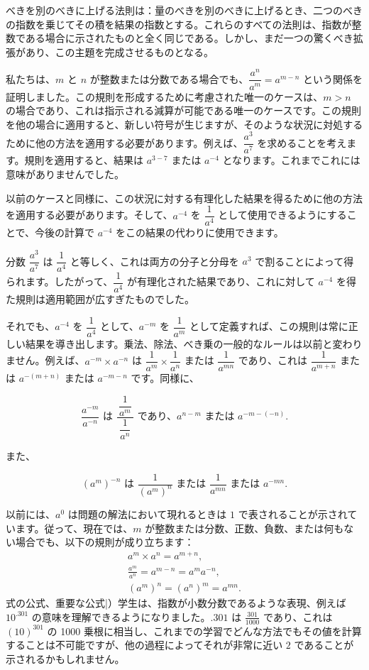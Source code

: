 \documentclass[a4paper,11pt,openany]{ltjsbook}
\newcommand{\Add}[1]{#1}
\begin{document}
べきを別のべきに上げる法則は：量のべきを別のべきに上げるとき、二つのべきの指数を乗じてその積を結果の指数とする。これらのすべての法則は、指数が整数である場合に示されたものと全く同じである。しかし、まだ一つの驚くべき拡張があり、この主題を完成させるものとなる。

私たちは、$m$ と $n$ が整数または分数である場合でも、$\dfrac{a^n}{a^m} = a^{m-n}$ という関係を証明しました。この規則を形成するために考慮された唯一のケースは、$m > n$ の場合であり、これは指示される減算が可能である唯一のケースです。この規則を他の場合に適用すると、新しい符号が生じますが、そのような状況に対処するために他の方法を適用する必要があります。例えば、$\dfrac{a^3}{a^7}$ を求めることを考えます。規則を適用すると、結果は $a^{3-7}$ または $a^{-4}$ となります。これまでこれには意味がありませんでした。

以前のケースと同様に、この状況に対する有理化した結果を得るために他の方法を適用する必要があります。そして、$a^{-4}$ を $\dfrac{1}{a^4}$ として使用できるようにすることで、今後の計算で $a^{-4}$ をこの結果の代わりに使用できます。

分数 $\dfrac{a^3}{a^7}$ は $\dfrac{1}{a^4}$ と等しく、これは両方の分子と分母を $a^3$ で割ることによって得られます。したがって、$\dfrac{1}{a^4}$ が有理化された結果であり、これに対して $a^{-4}$ を得た規則は適用範囲が広すぎたものでした。

それでも、$a^{-4}$ を $\dfrac{1}{a^4}$ として、$a^{-m}$ を $\dfrac{1}{a^m}$ として定義すれば、この規則は常に正しい結果を導き出します。乗法、除法、べき乗の一般的なルールは以前と変わりません。例えば、$a^{-m} × a^{-n}$ は $\dfrac{1}{a^m} × \dfrac{1}{a^n}$ または $\dfrac{1}{a^{mn}}$ であり、これは $\dfrac{1}{a^{m+n}}$ または $a^{-(m+n)}$ または $a^{-m-n}$ です。同様に、

\[
\dfrac{a^{-m}}{a^{-n}} \text{ は } \dfrac{\,\dfrac{1}{a^m}\,}{\dfrac{1}{a^n}} \text{ であり、} a^{n-m} \text{ または } a^{-m-(-n)}.
\]

また、

\[
(a^m)^{-n} \text{ は } \dfrac{1}{(a^m)^n} \text{ または } \dfrac{1}{a^{mn}} \text{ または } a^{-mn}.
\]

以前には、$a^{0}$ は問題の解法において現れるときは $1$ で表されることが示されています。従って、現在では、$m$ が整数または分数、正数、負数、または何もない場合でも、以下の規則が成り立ちます：
\begin{gather*}
a^{m} \times  a^{n} = a^{m+n}\Add{,} \\
\frac{a^{m}}{a^{n}} = a^{m-n} = a^{m} a^{-n}\Add{,} \\
(a^{m})^{n} = (a^{n})^{m} = a^{mn}.
\end{gather*}
式の公式、重要な公式|）学生は、指数が小数分数であるような表現、例えば $10^{.301}$ の意味を理解できるようになりました。$.301$ は $\frac{301}{1000}$ であり、これは $(10)^{301}$ の 1000 乗根に相当し、これまでの学習でどんな方法でもその値を計算することは不可能ですが、他の過程によってそれが非常に近い $2$ であることが示されるかもしれません。
\end{document}
